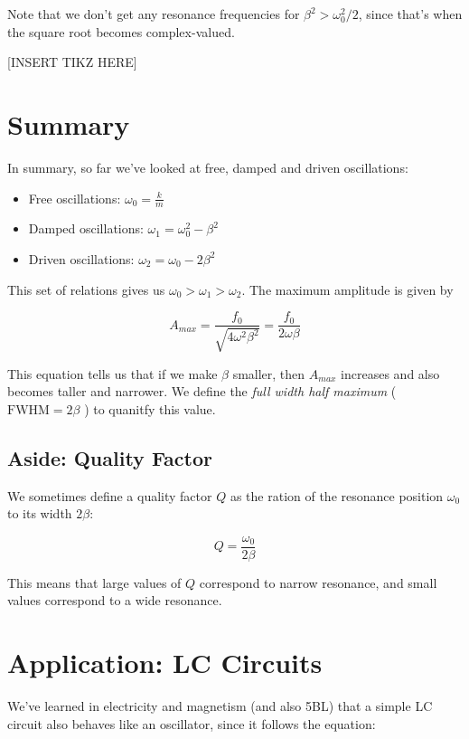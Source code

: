 \begin{insight*}{}{}
    Note that we don't get any resonance frequencies for $\beta^2 > \omega_0^2/2$, since that's when the square root becomes complex-valued.
\end{insight*}

[INSERT TIKZ HERE]

\section{Summary} 

In summary, so far we've looked at free, damped and driven oscillations: 
\begin{itemize}
    \item Free oscillations: $\omega_0 = \frac{k}{m}$
    \item Damped oscillations: $\omega_1 = \omega_0^2 - \beta^2$
    \item Driven oscillations: $\omega_2 = \omega_0 - 2\beta^2$
\end{itemize}

This set of relations gives us $\omega_0 > \omega_1 > \omega_2$. The maximum amplitude is given by 

\[ A_{max} = \frac{f_0}{\sqrt{4\omega^2\beta^2}} = \frac{f_0}{2\omega \beta}\]

This equation tells us that if we make $\beta$ smaller, then $A_{max}$ increases and also becomes taller and narrower. We define the \textit{full width half maximum} ($\text{FWHM} = 2\beta$ ) to quanitfy this value. 

\subsection{Aside: Quality Factor} 

We sometimes define a quality factor $Q$ as the ration of the resonance position $\omega_0$ to its width $2\beta$:

\[ Q = \frac{\omega_0}{2\beta}\] 

This means that large values of $Q$ correspond to narrow resonance, and small values correspond to a wide resonance. 

\section{Application: LC Circuits}

We've learned in electricity and magnetism (and also 5BL) that a simple LC circuit also behaves like an oscillator, since it follows the equation: 

